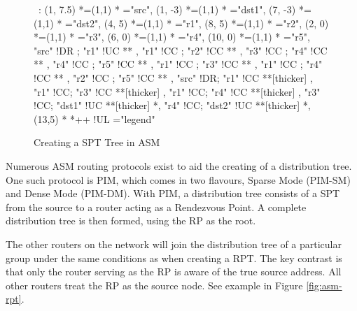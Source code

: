 \begin{figure}[ht]
\label{fig:asm-spt}

\begin{center}

\ \xy<1cm,0cm>:
(1, 7.5)  *=(1,1) 	  	*\frm{-}  ="src",
(1, -3)   *=(1,1) 	*\frm{-}  ="dst1",
(7, -3)   *=(1,1) 	*\frm{-}  ="dst2",
%
(4,  5)   *=(1,1)  *   ="r1",
(8,  5)   *=(1,1)  *   ="r2",
(2,  0)   *=(1,1)  *   ="r3",
(6,  0)   *=(1,1)  *   ="r4",
(10, 0)   *=(1,1)  *   ="r5",
%
"src" !DR ; "r1" !UC **\dir{~} ,
%
"r1" !CC ; "r2" !CC **\dir{~} ,
"r3" !CC ; "r4" !CC **\dir{~} ,
"r4" !CC ; "r5" !CC **\dir{~} ,
"r1" !CC ; "r3" !CC **\dir{~} ,
"r1" !CC ; "r4" !CC **\dir{~} ,
"r2" !CC ; "r5" !CC **\dir{~} ,
%
"src" !DR; "r1"   !CC **[thicker]\dir{=} ,
"r1"  !CC; "r3"   !CC **[thicker]\dir{=} ,
"r1"  !CC; "r4"   !CC **[thicker]\dir{=} ,
"r3"  !CC; "dst1" !UC **[thicker]\dir{=} *,
"r4"  !CC; "dst2" !UC **[thicker]\dir{=} *,
%
\POS (13,5) * *++\frm{-} !UL ="legend"
\endxy

\end{center}

\caption{Creating a SPT Tree in ASM}

\end{figure}


Numerous ASM routing protocols exist to aid the creating of a
distribution tree. One such protocol is PIM, which comes in two 
flavours, Sparse Mode (PIM-SM) and Dense Mode (PIM-DM). With PIM, a
distribution tree consists of a SPT from the source to a router acting 
as a Rendezvous Point. A complete distribution tree is then formed,
using the RP as the root.


The other routers on the network will join the distribution tree of a 
particular group under the same conditions as when creating a RPT. The 
key contrast is that only the router serving as the RP is aware of the 
true source address. All other routers treat the RP as the source node. 
See example in Figure \ref{fig:asm-rpt}.

